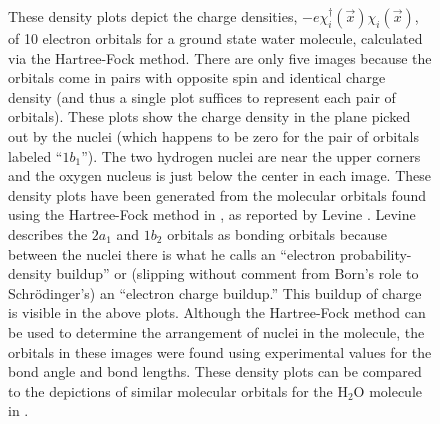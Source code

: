 \documentclass[onecolumn,secnumarabic,amsmath,amssymb,balancelastpage,nofootinbib]{article}
\begin{document}
\begin{figure}[p]
\caption{These density plots depict the charge densities, $-e\chi_i^{\dagger}(\vec{x})\chi_i(\vec{x})$, of 10 electron orbitals for a ground state water molecule, calculated via the Hartree-Fock method.  There are only five images because the orbitals come in pairs with opposite spin and identical charge density (and thus a single plot suffices to represent each pair of orbitals).  These plots show the charge density in the plane picked out by the nuclei (which happens to be zero for the pair of orbitals labeled ``$1b_1$'').  The two hydrogen nuclei are near the upper corners and the oxygen nucleus is just below the center in each image.  These density plots have been generated from the molecular orbitals found using the Hartree-Fock method in \cite{aung1968,pitzer1970}, as reported by Levine \cite[sec.\ 15.5]{levineQC}.  Levine \cite[pg.\ 452]{levineQC} describes the $2a_1$ and $1b_2$ orbitals as bonding orbitals because between the nuclei there is what he calls an ``electron probability-density buildup'' or (slipping without comment from Born's role to Schr\"{o}dinger's) an ``electron charge buildup.''  This buildup of charge is visible in the above plots.  Although the Hartree-Fock method can be used to determine the arrangement of nuclei in the molecule, the orbitals in these images were found using experimental values for the bond angle and bond lengths.  These density plots can be compared to the depictions of similar molecular orbitals for the H$_2$O molecule in \cite{dunning1972}.}
\label{waterorbitals}
\end{figure}
\end{document}
